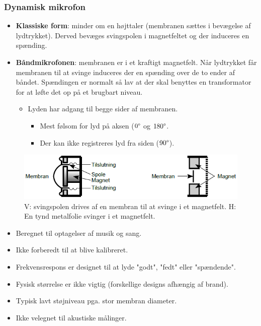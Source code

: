 \subsubsection{Dynamisk mikrofon}
\begin{itemize}
	\item \textbf{Klassiske form}: minder om en højttaler (membranen sættes i bevægelse af lydtrykket). Derved bevæges svingspolen i magnetfeltet
	og der induceres en spænding.
	\item \textbf{Båndmikrofonen}: membranen er i et kraftigt magnetfelt. Når lydtrykket får membranen til at svinge induceres der en spænding over de to ender af båndet. Spændingen er normalt så lav at der skal benyttes en transformator for at løfte det op på et brugbart niveau. 
	\begin{itemize}
		\item Lyden har adgang til begge sider af membranen.
		\begin{itemize}
			\item Mest følsom for lyd på aksen ($0\degree$ og $180\degree$.
			\item Der kan ikke registreres lyd fra siden ($90\degree$).
		\end{itemize}
	\end{itemize} 
\end{itemize}
\begin{figure} [H]
	\centering
	\includegraphics[width=.85\linewidth]{graphics/12.png}
	\caption{V: svingspolen drives af en membran til at svinge i et magnetfelt. H: En tynd metalfolie svinger i et magnetfelt.}
	\label{fig:12}
\end{figure}

\begin{itemize}
	\item Beregnet til optagelser af musik og sang.
	\item Ikke forberedt til at blive kalibreret.
	\item Frekvensrespons er designet til at lyde "godt", "fedt" eller "spændende".
	\item Fysisk størrelse er ikke vigtig (forskellige designs afhængig af brand).
	\item Typisk lavt støjniveau pga. stor membran diameter.
	\item Ikke velegnet til akustiske målinger.
\end{itemize}

